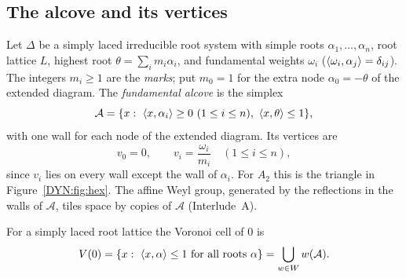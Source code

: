 \subsection*{The alcove and its vertices}
Let $\Delta$ be a simply laced irreducible root system with simple roots $\alpha_1,\dots,\alpha_n$, root
lattice $L$, highest root $\theta=\sum_im_i\alpha_i$, and fundamental weights $\omega_i$
($\langle \omega_i, \alpha_j\rangle=\delta_{ij}$). The integers $m_i\ge1$ are the \emph{marks}; put $m_0=1$ for the
extra node $\alpha_0=-\theta$ of the extended diagram. The \emph{fundamental alcove} is the simplex
\[
  \mathcal A=\{x:\ \langle x, \alpha_i\rangle\ge0\ (1\le i\le n),\ \langle x, \theta\rangle\le1\},
\]
with one wall for each node of the extended diagram. Its vertices are
\[
  v_0=0,\qquad v_i=\frac{\omega_i}{m_i}\quad(1\le i\le n),
\]
since $v_i$ lies on every wall except the wall of $\alpha_i$. For $A_2$ this is the triangle in
Figure~\ref{DYN:fig:hex}. The affine Weyl group, generated by the reflections in the walls of
$\mathcal A$, tiles space by copies of $\mathcal A$ (Interlude~A).

\begin{lemma}\label{DYN:lem:relevant}
For a simply laced root lattice the Voronoi cell of $0$ is
\[
  V(0)=\{x:\ \langle x, \alpha\rangle\le1\text{ for all roots }\alpha\}=\bigcup_{w\in W}w(\mathcal A).
\]
\end{lemma}

